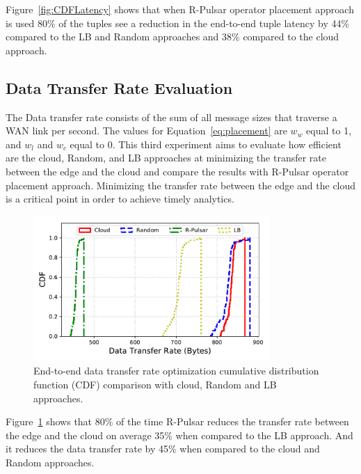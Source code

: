 Figure~\ref{fig:CDFLatency} shows that when R-Pulsar operator placement approach is used 80\% of the tuples see a reduction in the end-to-end tuple latency by 44\% compared to the LB and Random approaches and 38\% compared to the cloud approach. 

\subsection{Data Transfer Rate Evaluation}

The Data transfer rate consists of the sum of all message sizes that traverse a WAN link per second. The values for Equation~\ref{eq:placement} are $w_w$ equal to 1, and $w_l$ and $w_c$ equal to 0. This third experiment aims to evaluate how efficient are the cloud, Random, and LB approaches at minimizing the transfer rate between the edge and the cloud and compare the results with R-Pulsar operator placement approach. Minimizing the transfer rate between the edge and the cloud is a critical point in order to achieve timely analytics. 

\begin{figure}
  \centering
  \includegraphics[width=0.8\textwidth]{Results/CDF_bandwidth.pdf}
  \caption{End-to-end data transfer rate optimization cumulative distribution function (CDF) comparison with cloud, Random and LB approaches.}
  \label{fig:bandwidth}
\end{figure} 


Figure~\ref{fig:bandwidth} shows that 80\% of the time R-Pulsar reduces the transfer rate between the edge and the cloud on average 35\% when compared to the LB approach. And it reduces the data transfer rate by 45\% when compared to the cloud and Random approaches.


